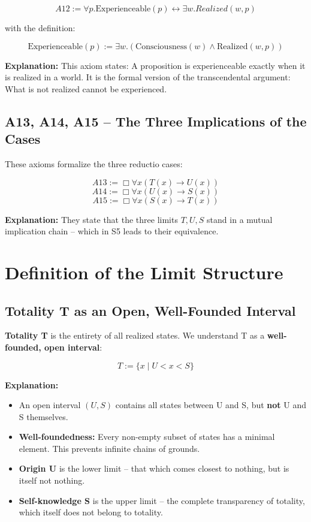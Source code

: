 \documentclass[
]{article}
\begin{document}
\[
\boxed{A12 := \forall p. \text{Experienceable}(p) \leftrightarrow \exists w. Realized(w, p)}
\]

with the definition:

\[
\boxed{\text{Experienceable}(p) := \exists w. (\text{Consciousness}(w) \land \text{Realized}(w, p))}
\]

\textbf{Explanation:} This axiom states: A proposition is experienceable exactly when it is realized in a world. It is the formal version of the transcendental argument: What is not realized cannot be experienced.

\subsection{A13, A14, A15 – The Three Implications of the Cases}

These axioms formalize the three reductio cases:

\[
\boxed{A13 := \Box\forall x(T(x) \rightarrow U(x))}
\]
\[
\boxed{A14 := \Box\forall x(U(x) \rightarrow S(x))}
\]
\[
\boxed{A15 := \Box\forall x(S(x) \rightarrow T(x))}
\]

\textbf{Explanation:} They state that the three limits \(T, U, S\) stand in a mutual implication chain – which in S5 leads to their equivalence.

\section{Definition of the Limit Structure}

\subsection{Totality T as an Open, Well-Founded Interval}

\textbf{Totality T} is the entirety of all realized states. We understand T as a \textbf{well-founded, open interval}:

\[
\boxed{T := \{ x \mid U < x < S \}}
\]

\textbf{Explanation:}
\begin{itemize}
\item An open interval \((U, S)\) contains all states between U and S, but \textbf{not} U and S themselves.
\item \textbf{Well-foundedness:} Every non-empty subset of states has a minimal element. This prevents infinite chains of grounds.
\item \textbf{Origin U} is the lower limit – that which comes closest to nothing, but is itself not nothing.
\item \textbf{Self-knowledge S} is the upper limit – the complete transparency of totality, which itself does not belong to totality.
\end{itemize}
\end{document}
